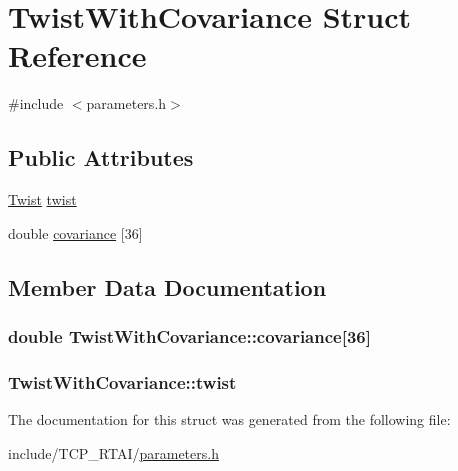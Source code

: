 \hypertarget{structTwistWithCovariance}{
\section{TwistWithCovariance Struct Reference}
\label{structTwistWithCovariance}
}


{\ttfamily \#include $<$parameters.h$>$}

\subsection*{Public Attributes}
\begin{DoxyCompactItemize}
\item 
\hyperlink{structTwist}{Twist} \hyperlink{structTwistWithCovariance_aba2724196f17138dde681577baa296a2}{twist}
\item 
double \hyperlink{structTwistWithCovariance_ac76a7fc3d8f8498bd8c367d93f5dc9c9}{covariance} \mbox{[}36\mbox{]}
\end{DoxyCompactItemize}


\subsection{Member Data Documentation}
\hypertarget{structTwistWithCovariance_ac76a7fc3d8f8498bd8c367d93f5dc9c9}{
\subsubsection[{covariance}]{\setlength{\rightskip}{0pt plus 5cm}double {\bf TwistWithCovariance::covariance}\mbox{[}36\mbox{]}}}
\label{structTwistWithCovariance_ac76a7fc3d8f8498bd8c367d93f5dc9c9}
\hypertarget{structTwistWithCovariance_aba2724196f17138dde681577baa296a2}{
\subsubsection[{twist}]{ {\bf TwistWithCovariance::twist}}}
\label{structTwistWithCovariance_aba2724196f17138dde681577baa296a2}


The documentation for this struct was generated from the following file:\begin{DoxyCompactItemize}
\item 
include/TCP\_\-RTAI/\hyperlink{include_2TCP__RTAI_2parameters_8h}{parameters.h}\end{DoxyCompactItemize}
